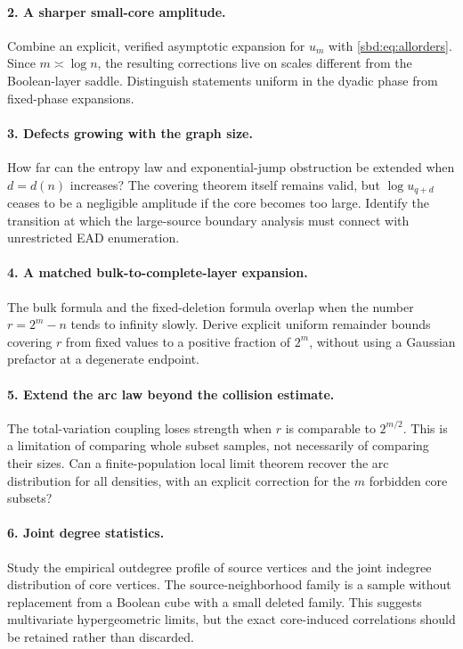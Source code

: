 \documentclass[11pt,a4paper]{article}
\theoremstyle{definition}
\begin{document}
\paragraph{2. A sharper small-core amplitude.}
Combine an explicit, verified asymptotic expansion for $u_m$ with
\eqref{sbd:eq:allorders}. Since $m\asymp\log n$, the resulting corrections
live on scales different from the Boolean-layer saddle. Distinguish
statements uniform in the dyadic phase from fixed-phase expansions.

\paragraph{3. Defects growing with the graph size.}
How far can the entropy law and exponential-jump obstruction be extended
when $d=d(n)$ increases? The covering theorem itself remains valid, but
$\log u_{q+d}$ ceases to be a negligible amplitude if the core becomes
too large. Identify the transition at which the large-source boundary
analysis must connect with unrestricted EAD enumeration.

\paragraph{4. A matched bulk-to-complete-layer expansion.}
The bulk formula and the fixed-deletion formula overlap when the number
$r=2^m-n$ tends to infinity slowly. Derive explicit uniform remainder
bounds covering $r$ from fixed values to a positive fraction of $2^m$,
without using a Gaussian prefactor at a degenerate endpoint.

\paragraph{5. Extend the arc law beyond the collision estimate.}
The total-variation coupling loses strength when $r$ is comparable to
$2^{m/2}$. This is a limitation of comparing whole subset samples, not
necessarily of comparing their sizes. Can a finite-population local
limit theorem recover the arc distribution for all densities, with an
explicit correction for the $m$ forbidden core subsets?

\paragraph{6. Joint degree statistics.}
Study the empirical outdegree profile of source vertices and the joint
indegree distribution of core vertices. The source-neighborhood family
is a sample without replacement from a Boolean cube with a small deleted
family. This suggests multivariate hypergeometric limits, but the exact
core-induced correlations should be retained rather than discarded.
\end{document}
